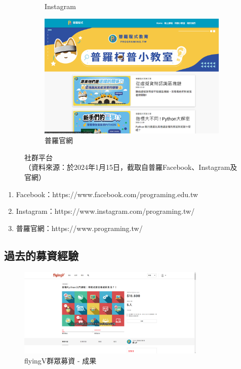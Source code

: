 \begin{figure}[H]
\begin{subfigure}{0.32\linewidth}
		\caption{Instagram}
		\label{fig:IG}
	\end{subfigure}
	\begin{subfigure}{0.32\linewidth}
		\centering
		\includegraphics[width=1\textwidth]{images/website.png}
		\caption{普羅官網}
		\label{fig:website}
	\end{subfigure}
	\caption[社群平台]{社群平台\\（資料來源：於2024年1月15日，截取自普羅Facebook、Instagram及官網）}
	\label{fig:platform}
\end{figure}

\begin{enumerate}
	\item Facebook：https://www.facebook.com/programing.edu.tw
	\item Instagram：https://www.instagram.com/programing.tw/
	\item 普羅官網：https://www.programing.tw/
\end{enumerate}

\subsection{過去的募資經驗}
\label{fig:Appendix-fundraising}
\begin{figure}[H]
	\centering
	\includegraphics[width=0.8\textwidth]{images/flyingv-19600.png}
	\caption{flyingV群眾募資 - 成果}
	\label{fig:flyingv}
\end{figure}

